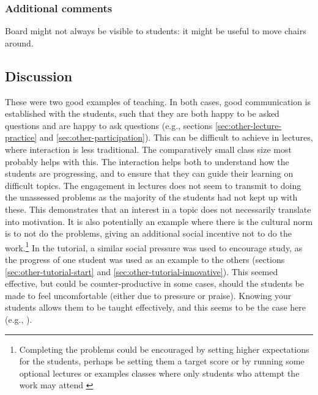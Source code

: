 \subsubsection{Additional comments}

Board might not always be visible to students: it might be useful to move chairs around.

\subsection{Discussion}\label{sec:other-discuss}

These were two good examples of teaching. In both cases, good communication is established with the students, such that they are both happy to be asked questions and are happy to ask questions (e.g., sections \ref{sec:other-lecture-practice} and \ref{sec:other-participation}). This can be difficult to achieve in lectures, where interaction is less traditional. The comparatively small class size most probably helps with this. The interaction helps both to understand how the students are progressing, and to ensure that they can guide their learning on difficult topics. The engagement in lectures does not seem to transmit to doing the unassessed problems as the majority of the students had not kept up with these. This demonstrates that an interest in a topic does not necessarily translate into motivation. It is also potentially an example where there is the cultural norm is to not do the problems, giving an additional social incentive not to do the work.\footnote{Completing the problems could be encouraged by setting higher expectations for the students, perhaps be setting them a target score or by running some optional lectures or examples classes where only students who attempt the work may attend \citep[cf.][chapter 10, passports for seminars case study]{Jaques2007}} In the tutorial, a similar social pressure was used to encourage study, as the progress of one student was used as an example to the others (sections \ref{sec:other-tutorial-start} and \ref{sec:other-tutorial-innovative}). This seemed effective, but could be counter-productive in some cases, should the students be made to feel uncomfortable (either due to pressure or praise). Knowing your students allows them to be taught effectively, and this seems to be the case here (e.g., ).


